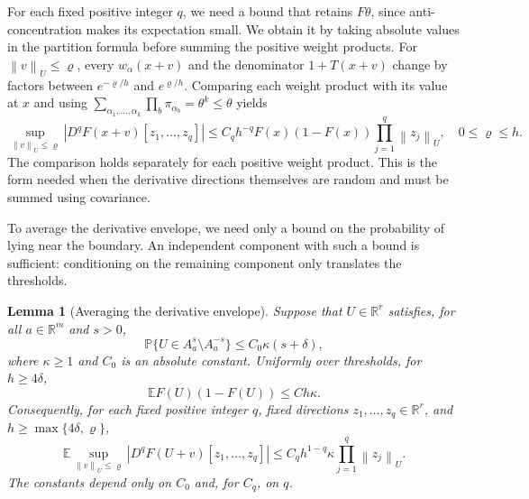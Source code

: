 \documentclass[11pt,letterpaper]{article}
\newenvironment{vSixBlock}{\color{magenta}}{}
\newtheorem{lemma}{Lemma}
\theoremstyle{remark}
\newcommand{\E}{\mathbb E}
\newcommand{\Pp}{\mathbb P}
\newcommand{\R}{\mathbb R}
\newcommand{\norm}[1]{\left\lVert#1\right\rVert}
\begin{document}
For each fixed {positive integer \(q\)}, we need a bound that retains
\(F\theta\), since anti-concentration makes its expectation small.
We obtain it by taking absolute values in the partition formula
before summing the positive weight products.
For \(\norm v_U\le\varrho\), every \(w_\alpha(x+v)\) and the
denominator \(1+T(x+v)\) change by factors between
\(e^{-\varrho/h}\) and \(e^{\varrho/h}\). Comparing each weight
product with its value at \(x\) and using
\(\sum_{\alpha_1,\ldots,\alpha_k}\prod_b\pi_{\alpha_b}
=\theta^k\le\theta\) yields
\begin{equation}
 \sup_{\norm v_U\le\varrho}|D^qF(x+v)[z_1,\ldots,z_q]|
 \le C_qh^{-q}F(x)(1-F(x))\prod_{j=1}^q\norm{z_j}_U,
 \quad 0\le\varrho\le h.
 \label{appx-eq:local-envelope}
\end{equation}
The comparison holds separately for each positive weight product.
This is the form needed when the derivative directions themselves
are random and must be summed using covariance.

\begin{vSixBlock}
To average the derivative envelope, we need only a bound on the
probability of lying near the boundary. An independent component with
such a bound is sufficient: conditioning on the remaining component
only translates the thresholds.

\begin{lemma}[Averaging the derivative envelope]\label{appx-lem:envelope}
Suppose that \(U\in\R^r\) satisfies, for all \(a\in\R^m\) and
\(s>0\),
\[
 \Pp\{U\in A_a^s\setminus A_a^{-s}\}
 \le C_0\kappa(s+\delta),
\]
where \(\kappa\ge1\) and \(C_0\) is an absolute constant.
Uniformly over thresholds, for \(h\ge4\delta\),
\begin{equation}
 \E F(U)(1-F(U))\le Ch\kappa.
 \label{appx-eq:small-envelope}
\end{equation}
Consequently, for each fixed positive integer \(q\), fixed directions
\(z_1,\ldots,z_q\in\R^r\), and
\(h\ge\max\{4\delta,\varrho\}\),
\begin{equation}
 \E\sup_{\norm v_U\le\varrho}|D^qF(U+v)[z_1,\ldots,z_q]|
 \le C_qh^{1-q}\kappa\prod_{j=1}^q\norm{z_j}_U.
 \label{appx-eq:averaged-derivatives}
\end{equation}
The constants depend only on \(C_0\) and, for \(C_q\), on \(q\).
\end{lemma}
\end{vSixBlock}
\end{document}
